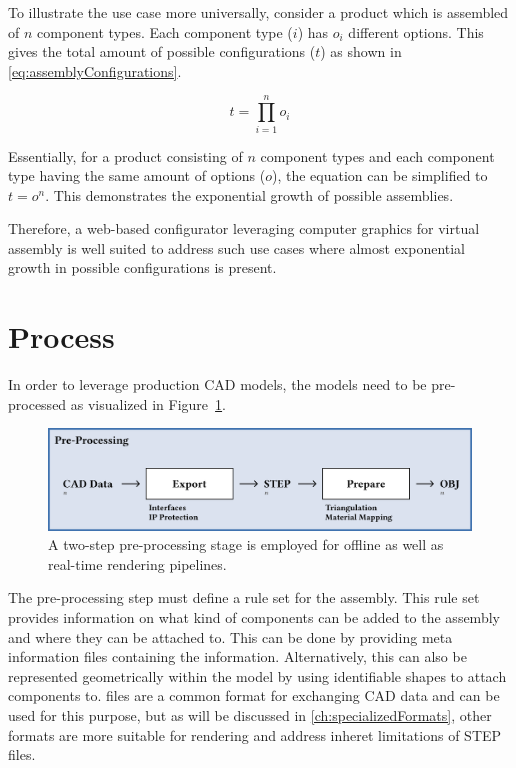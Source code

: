 To illustrate the use case more universally, consider a product which is assembled of $n$ component types. Each component type ($i$) has $o_i$ different options. This gives the total amount of possible configurations ($t$) as shown in \autoref{eq:assemblyConfigurations}.

\begin{equation}
  t = \prod_{i=1}^n o_i
  \label{eq:assemblyConfigurations}
\end{equation}

Essentially, for a product consisting of $n$ component types and each component type having the same amount of options ($o$), the equation can be simplified to $t = o^n$. This demonstrates the exponential growth of possible assemblies.

Therefore, a web-based configurator leveraging computer graphics for virtual assembly is well suited to address such use cases where almost exponential growth in possible configurations is present.

\section{Process}

In order to leverage production \gls{CAD} models, the models need to be pre-processed as visualized in Figure~\ref{fig:cad-preprocessing}. 

\begin{figure}[H]
  \centering
  \includegraphics[width=0.9\columnwidth]{resources/cad-pipeline-preprocessing.png}
  \caption{A two-step pre-processing stage is employed for offline as well as real-time rendering pipelines.}
  \label{fig:cad-preprocessing}
\end{figure}

The pre-processing step must define a rule set for the assembly. This rule set provides information on what kind of components can be added to the assembly and where they can be attached to. This can be done by providing meta information files containing the information. Alternatively, this can also be represented geometrically within the model by using identifiable shapes to attach components to.  files are a common format for exchanging \gls{CAD} data and can be used for this purpose, but as will be discussed in \autoref{ch:specializedFormats}, other formats are more suitable for rendering and address inheret limitations of \gls{STEP} files.

